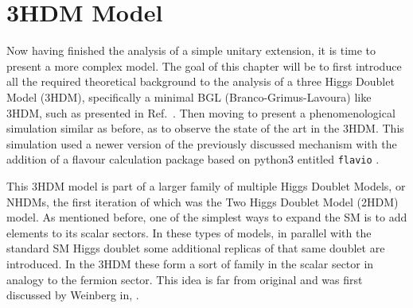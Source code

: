 
\newpage 

\chapter{3HDM Model}


%


Now having finished the analysis of a simple unitary extension, it is time to present a more complex model. 
%
The goal of this chapter will be to first introduce all the required theoretical background to the analysis of a three Higgs Doublet Model (3HDM), specifically a minimal BGL (Branco-Grimus-Lavoura) like 3HDM, such as presented in Ref.~\cite{Ludvig_Thesis}. 
% 
Then moving to present a phenomenological simulation similar as before, as to observe the state of the art in the 3HDM. 
%
This simulation used a newer version of the previously discussed mechanism with the addition of a flavour calculation package based on python3 entitled \texttt{flavio} \cite{straub2018flavio}. 

This 3HDM model is part of a larger family of multiple Higgs Doublet Models, or NHDMs, the first iteration of which was the Two Higgs Doublet Model (2HDM) model. 
% 
As mentioned before, one of the simplest ways to expand the SM is to add elements to its scalar sectors.
%
In these types of models, in parallel with the standard SM Higgs doublet some additional replicas of that same doublet are introduced. 
%
In the 3HDM these form a sort of family in the scalar sector in analogy to the fermion sector. 
%
This idea is far from original and was first discussed by Weinberg in, \cite{Weinberg1976}.

